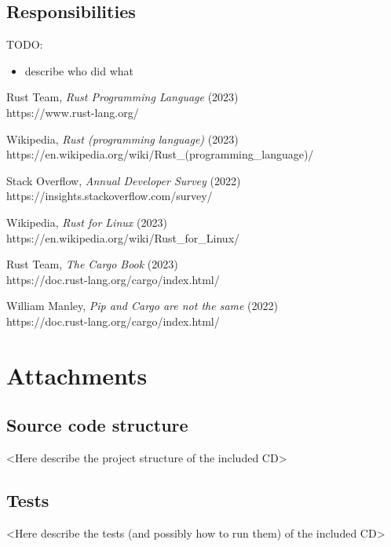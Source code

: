 \documentclass[licencjacka,en]{pracamgr}
\begin{document}
\section{Responsibilities}

TODO:
\begin{itemize}
	\item describe who did what
\end{itemize}


\appendix

\begin{thebibliography}{99}\label{r:chapter_bibliography}


 Rust Team,
	\textit{Rust Programming Language} (2023) \\
	https://www.rust-lang.org/

 Wikipedia,
	\textit{Rust (programming language)} (2023) \\
	https://en.wikipedia.org/wiki/Rust\_(programming\_language)/

 Stack Overflow,
	\textit{Annual Developer Survey} (2022) \\
	https://insights.stackoverflow.com/survey/

 Wikipedia,
	\textit{Rust for Linux} (2023) \\
	https://en.wikipedia.org/wiki/Rust\_for\_Linux/

 Rust Team,
	\textit{The Cargo Book} (2023) \\
	https://doc.rust-lang.org/cargo/index.html/

 William Manley,
	\textit{Pip and Cargo are not the same} (2022) \\
	https://doc.rust-lang.org/cargo/index.html/

\end{thebibliography}


\chapter*{Attachments}\label{r:chapter_attachments}

\section*{Source code structure}

<Here describe the project structure of the included CD>


\section*{Tests}

<Here describe the tests (and possibly how to run them) of the included CD>
\end{document}
